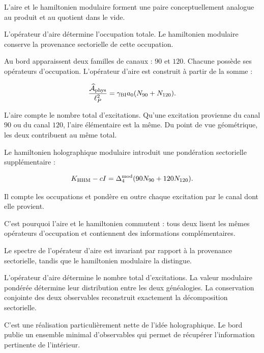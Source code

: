 L'aire et le hamiltonien modulaire forment une paire conceptuellement analogue au produit et au quotient dans le vide.\par

L'opérateur d'aire détermine l'occupation totale. Le hamiltonien modulaire conserve la provenance sectorielle de cette occupation.\par

Au bord apparaissent deux familles de canaux : \(90\) et \(120\). Chacune possède ses opérateurs d'occupation. L'opérateur d'aire est construit à partir de la somme :\par

\[
\frac{\widehat{\mathcal A}_{\rm phys}}{\ell_P^2}
=
\gamma_{\rm BI}a_0
(N_{90}+N_{120}).
\]

L'aire compte le nombre total d'excitations. Qu'une excitation provienne du canal \(90\) ou du canal \(120\), l'aire élémentaire est la même. Du point de vue géométrique, les deux contribuent au même total.\par

Le hamiltonien holographique modulaire introduit une pondération sectorielle supplémentaire :\par

\[
K_{\rm HHM}-cI
=
\Delta_4^{\rm mod}
(90N_{90}+120N_{120}).
\]

Il compte les occupations et pondère en outre chaque excitation par le canal dont elle provient.\par

C'est pourquoi l'aire et le hamiltonien commutent : tous deux lisent les mêmes opérateurs d'occupation et contiennent des informations complémentaires.\par

Le spectre de l'opérateur d'aire est invariant par rapport à la provenance sectorielle, tandis que le hamiltonien modulaire la distingue.\par

L'opérateur d'aire détermine le nombre total d'excitations. La valeur modulaire pondérée détermine leur distribution entre les deux généalogies. La conservation conjointe des deux observables reconstruit exactement la décomposition sectorielle.\par

C'est une réalisation particulièrement nette de l'idée holographique. Le bord publie un ensemble minimal d'observables qui permet de récupérer l'information pertinente de l'intérieur.\par

